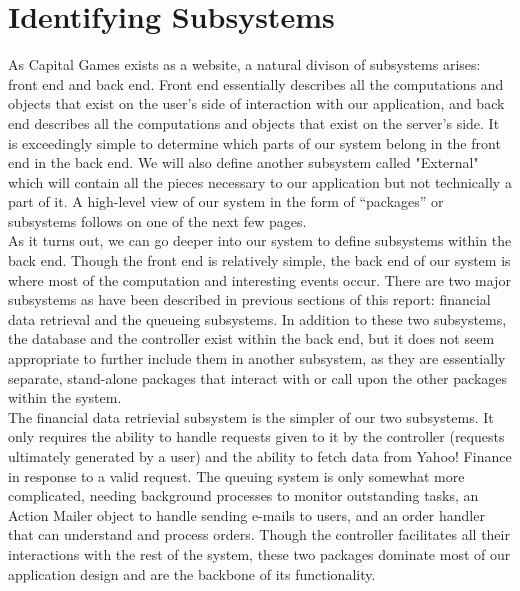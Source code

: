 \section{Identifying Subsystems}
As Capital Games exists as a website, a natural divison of subsystems arises: front end and back end. Front end essentially describes all the computations and objects that exist on the user's side of interaction with our application, and back end describes all the computations and objects that exist on the server's side. It is exceedingly simple to determine which parts of our system belong in the front end in the back end. We will also define another subsystem called "External" which will contain all the pieces necessary to our application but not technically a part of it. A high-level view of our system in the form of ``packages'' or subsystems follows on one of the next few pages. \\

As it turns out, we can go deeper into our system to define subsystems within the back end. Though the front end is relatively simple, the back end of our system is where most of the computation and interesting events occur. There are two major subsystems as have been described in previous sections of this report: financial data retrieval and the queueing subsystems. In addition to these two subsystems, the database and the controller exist within the back end, but it does not seem appropriate to further include them in another subsystem, as they are essentially separate, stand-alone packages that interact with or call upon the other packages within the system. \\

The financial data retrievial subsystem is the simpler of our two subsystems. It only requires the ability to handle requests given to it by the controller (requests ultimately generated by a user) and the ability to fetch data from Yahoo! Finance in response to a valid request. The queuing system is only somewhat more complicated, needing background processes to monitor outstanding tasks, an Action Mailer object to handle sending e-mails to users, and an order handler that can understand and process orders. Though the controller facilitates all their interactions with the rest of the system, these two packages dominate most of our application design and are the backbone of its functionality. \\ \\ \\ \\ \\ \\ \\ \\

